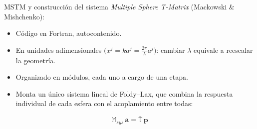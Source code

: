 \documentclass[aspectratio=43,11pt]{beamer}
\begin{document}
\begin{frame}{MSTM y construcción del sistema}
  \vspace{10pt}
  \textit{Multiple Sphere T-Matrix} (Mackowski \& Mishchenko):
  \vspace{10pt}
  \begin{itemize}
    \setlength{\itemsep}{12pt}
    \item Código en Fortran, \alert{autocontenido}.
    \item En \alert{unidades adimensionales} $\bigl(x^j = k a^j = \frac{2\pi}{\lambda} a^j\bigr)$: cambiar $\lambda$ equivale a \alert{reescalar la geometría}.
    \item Organizado en \alert{módulos}, cada uno a cargo de una etapa.
    \item Monta un único sistema lineal de Foldy--Lax, que combina la \alert{respuesta individual} de cada esfera con el \alert{acoplamiento} entre todas:
  \end{itemize}
  \vspace{6pt}
  \begin{equation*}
    \mathbb{M}_{sys}\,\mathbf{a} = \bar{\mathbb{T}}\,\mathbf{p}
  \end{equation*}
\end{frame}
\end{document}
